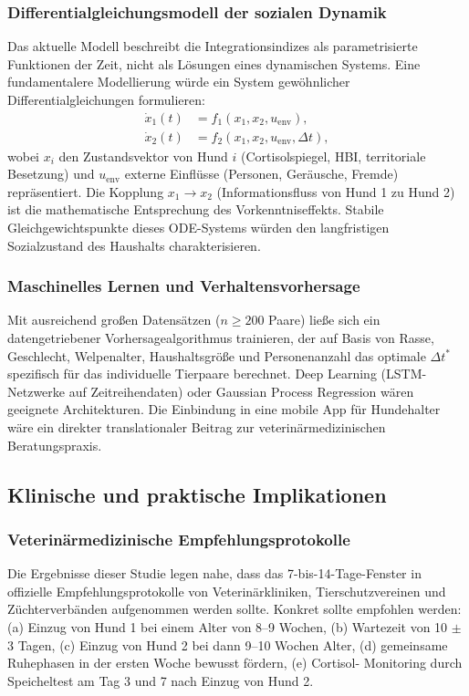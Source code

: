 ﻿\documentclass[12pt, a4paper]{article}
\theoremstyle{plain}
\theoremstyle{definition}
\theoremstyle{remark}
\newcommand{\dt}{\Delta t}
\begin{document}
\subsubsection{Differentialgleichungsmodell der sozialen Dynamik}

Das aktuelle Modell beschreibt die Integrationsindizes als parametrisierte
Funktionen der Zeit, nicht als Lösungen eines dynamischen Systems. Eine
fundamentalere Modellierung würde ein System gewöhnlicher
Differentialgleichungen formulieren:
\begin{align}
  \dot{x}_1(t) &= f_1(x_1, x_2, u_{\text{env}}),\\
  \dot{x}_2(t) &= f_2(x_1, x_2, u_{\text{env}}, \dt),
\end{align}
wobei $x_i$ den Zustandsvektor von Hund $i$ (Cortisolspiegel, HBI, territoriale
Besetzung) und $u_{\text{env}}$ externe Einflüsse (Personen, Geräusche, Fremde)
repräsentiert. Die Kopplung $x_1 \to x_2$ (Informationsfluss von Hund 1 zu
Hund 2) ist die mathematische Entsprechung des Vorkenntniseffekts. Stabile
Gleichgewichtspunkte dieses ODE-Systems würden den langfristigen
Sozialzustand des Haushalts charakterisieren.

\subsubsection{Maschinelles Lernen und Verhaltensvorhersage}

Mit ausreichend großen Datensätzen ($n \geq 200$ Paare) ließe sich ein
datengetriebener Vorhersagealgorithmus trainieren, der auf Basis von
Rasse, Geschlecht, Welpenalter, Haushaltsgröße und Personenanzahl das
optimale $\dt^*$ spezifisch für das individuelle Tierpaare berechnet. Deep
Learning (LSTM-Netzwerke auf Zeitreihendaten) oder Gaussian Process Regression
wären geeignete Architekturen. Die Einbindung in eine mobile App für
Hundehalter wäre ein direkter translationaler Beitrag zur veterinärmedizinischen
Beratungspraxis.

\subsection{Klinische und praktische Implikationen}

\subsubsection{Veterinärmedizinische Empfehlungsprotokolle}

Die Ergebnisse dieser Studie legen nahe, dass das 7-bis-14-Tage-Fenster
in offizielle Empfehlungsprotokolle von Veterinärkliniken, Tierschutzvereinen
und Züchterverbänden aufgenommen werden sollte. Konkret sollte empfohlen
werden: (a) Einzug von Hund 1 bei einem Alter von 8--9 Wochen, (b) Wartezeit
von 10 $\pm$ 3 Tagen, (c) Einzug von Hund 2 bei dann 9--10 Wochen Alter,
(d) gemeinsame Ruhephasen in der ersten Woche bewusst fördern, (e) Cortisol-
Monitoring durch Speicheltest am Tag 3 und 7 nach Einzug von Hund 2.
\end{document}
